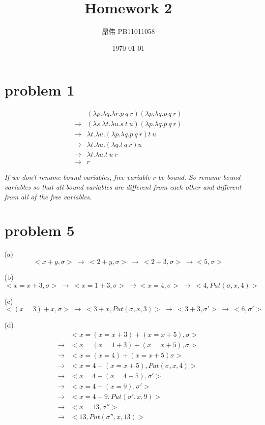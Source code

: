 \documentclass[4paper,10pt]{paper}
\title{Homework 2}
\author{昂伟 PB11011058}
\date{ \today }
\begin{document}
\maketitle

\section*{problem 1}

\begin{align*}
			&(\lambda p.\lambda q.\lambda r.p\ q\ r)(\lambda p.\lambda q.p\ q\ r)\\
\rightarrow & (\lambda s.\lambda t.\lambda u.s\ t\ u)(\lambda p.\lambda q.p\ q\ r)\\
\rightarrow & \lambda t.\lambda u.(\lambda p.\lambda q.p\ q\ r)t\ u \\
\rightarrow & \lambda t.\lambda u.(\lambda q.t\ q\ r)u \\
\rightarrow & \lambda t.\lambda u.t\ u\ r \\
\rightarrow & r
\end{align*}

\par \textit{If we don't rename bound variables, free variable $r$ be bound. So
rename bound variables so that all bound variables are different from
each other and different from all of the free variables.}

\section*{problem 5}

(a)$$<x+y,\sigma> \: \rightarrow \: <2+y,\sigma> \: \rightarrow \: <2+3,\sigma> \: \rightarrow<5,\sigma>$$

(b)$$<x=x+3,\sigma> \: \rightarrow \: <x=1+3,\sigma> \: \rightarrow<x=4,\sigma> \: \rightarrow \: <4,Put(\sigma,x,4)>$$

(c)$$<(x=3)+x,\sigma> \:\rightarrow \: <3+x,Put(\sigma,x,3)> \: \rightarrow \: <3+3,\sigma'> \: \rightarrow \: <6,\sigma'>$$

 (d)
 	\begin{align*}
 				 & <x=(x=x+3)+(x=x+5),\sigma> \\
 	 \rightarrow & <x=(x=1+3)+(x=x+5),\sigma>\\
	 \rightarrow & <x=(x=4)+(x=x+5)\sigma> \\
	 \rightarrow & <x=4+(x=x+5),Put(\sigma,x,4)>\\
	 \rightarrow & <x=4+(x=4+5),\sigma'> \\
	 \rightarrow & <x=4+(x=9),\sigma'>\\
	 \rightarrow & <x=4+9,Put(\sigma',x,9)> \\ 
	 \rightarrow &<x=13,\sigma''> \\
	 \rightarrow & <13,Put(\sigma'',x,13)>
	\end{align*}
	
\end{document}
